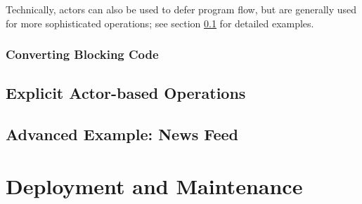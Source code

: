 Technically, actors can also be used to defer program flow, but are generally used for more sophisticated operations; see section \ref{lab:explicit-actors} for detailed examples. 

\subsubsection*{Converting Blocking Code}

\subsection{Explicit Actor-based Operations}
\label{lab:explicit-actors}

\subsection{Advanced Example: News Feed}

\section{Deployment and Maintenance}

























































